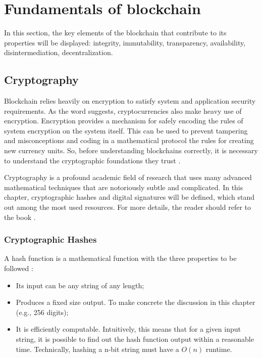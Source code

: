 \section{Fundamentals of blockchain}\label{sec:fundamentals}
In this section, the key elements of the blockchain that contribute to its properties will be displayed: integrity, immutability, transparency, availability, disintermediation, decentralization.

\subsection{Cryptography}\label{sec:criptografia}
Blockchain relies heavily on encryption to satisfy system and application security requirements. As the word suggests, cryptocurrencies also make heavy use of encryption. Encryption provides a mechanism for safely encoding the rules of system encryption on the system itself. This can be used to prevent tampering and misconceptions and coding in a mathematical protocol the rules for creating new currency units. So, before understanding blockchains correctly, it is necessary to understand the cryptographic foundations they trust \cite{narayanan2016bitcoin}.

Cryptography is a profound academic field of research that uses many advanced mathematical techniques that are notoriously subtle and complicated. In this chapter, cryptographic hashes and digital signatures will be defined, which stand out among the most used resources. For more details, the reader should refer to the book \cite{narayanan2016bitcoin}.

\subsubsection{Cryptographic Hashes}\label{sec:hashesCriptograficos}
A hash function is a mathematical function with the three properties to be followed \cite{narayanan2016bitcoin}:

\begin{itemize}
\item  Its input can be any string of any length;
\item Produces a fixed size output. To make concrete the discussion in this chapter (e.g., 256 digits);
\item It is efficiently computable. Intuitively, this means that for a given input string, it is possible to find out the hash function output within a reasonable time. Technically, hashing a n-bit string must have a $O(n)$ runtime.
\end{itemize}

